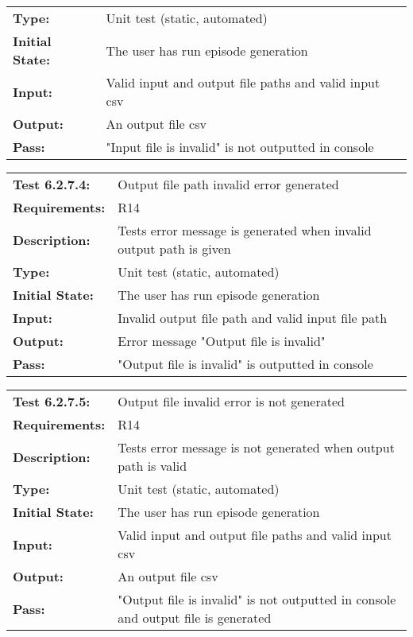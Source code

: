 \documentclass[12pt, titlepage]{article}
\begin{document}
{\begin{tabular}{|l|p{10cm}|}
    \bf{Type}: & Unit test (static, automated) \\
    \bf{Initial State}: & The user has run episode generation\\
    \bf{Input}: & Valid input and output  file paths and valid input csv   \\
    \bf{Output}: & An output file csv\\
    \bf{Pass}: & "Input file is invalid" is not outputted in console \\
    \hline
\end{tabular}
\begin{tabular}{|l|p{10cm}|}
    \hline
    \bf{Test} 6.2.7.4: & Output file path invalid error generated\\
    \bf{Requirements}: &  R14\\
    \bf{Description}: & Tests error message is generated when invalid output path is given\\
    \bf{Type}: & Unit test (static, automated) \\
    \bf{Initial State}: & The user has run episode generation\\
    \bf{Input}: & Invalid output file path and valid input file path \\
    \bf{Output}: & Error message "Output file is invalid" \\
    \bf{Pass}: & "Output file is invalid" is outputted in console \\
    \hline
\end{tabular}
\begin{tabular}{|l|p{10cm}|}
    \hline
    \bf{Test} 6.2.7.5: & Output file invalid error is not generated\\
    \bf{Requirements}: & R14 \\
    \bf{Description}: & Tests error message is not generated when output path is valid\\
    \bf{Type}: & Unit test (static, automated) \\
    \bf{Initial State}: & The user has run episode generation\\
    \bf{Input}: & Valid input and output  file paths and valid input csv   \\
    \bf{Output}: & An output file csv\\
    \bf{Pass}: & "Output file is invalid" is not outputted in console and output file is generated\\
    \hline
\end{tabular}
\begin{tabular}{|l|p{10cm}|}

\end{tabular}}
\end{document}
